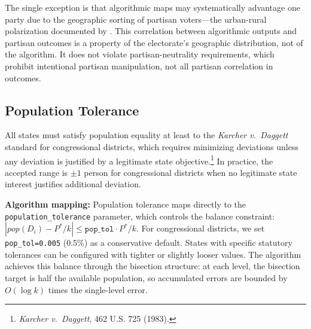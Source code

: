 The single exception is that algorithmic maps may systematically advantage one party due to the geographic sorting of partisan voters---the urban-rural polarization documented by \citet{chen2013unintentional}. This correlation between algorithmic outputs and partisan outcomes is a property of the electorate's geographic distribution, not of the algorithm. It does not violate partisan-neutrality requirements, which prohibit intentional partisan manipulation, not all partisan correlation in outcomes.

\subsection{Population Tolerance}

All states must satisfy population equality at least to the \textit{Karcher v.\ Daggett} standard for congressional districts, which requires minimizing deviations unless any deviation is justified by a legitimate state objective.\footnote{\textit{Karcher v.\ Daggett}, 462 U.S. 725 (1983).} In practice, the accepted range is $\pm 1$ person for congressional districts when no legitimate state interest justifies additional deviation.

\textbf{Algorithm mapping:} Population tolerance maps directly to the \texttt{population\_tolerance} parameter, which controls the balance constraint: $|pop(D_i) - P^*/k| \le \texttt{pop\_tol} \cdot P^*/k$. For congressional districts, we set \texttt{pop\_tol=0.005} (0.5\%) as a conservative default. States with specific statutory tolerances can be configured with tighter or slightly looser values. The algorithm achieves this balance through the bisection structure: at each level, the bisection target is half the available population, so accumulated errors are bounded by $O(\log k)$ times the single-level error.
